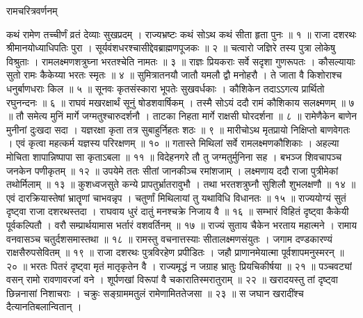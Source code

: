 
\translink{}

रामचरित्रवर्णनम्

कथं रामेण तच्चीर्णं व्रतं देव्याः सुखप्रदम् ।
राज्यभ्रष्टः कथं सोऽथ कथं सीता हृता पुनः ॥ १ ॥
राजा दशरथः श्रीमानयोध्याधिपतिः पुरा ।
सूर्यवंशधरश्चासीद्देवब्राह्मणपूजकः ॥ २ ॥
चत्वारो जज्ञिरे तस्य पुत्रा लोकेषु विश्रुताः ।
रामलक्ष्मणशत्रुघ्ना भरतश्चेति नामतः ॥ ३ ॥
राज्ञः प्रियकराः सर्वे सदृशा गुणरूपतः ।
कौसल्यायाः सुतो रामः कैकेय्या भरतः स्मृतः ॥ ४ ॥
सुमित्रातनयौ जातौ यमलौ द्वौ मनोहरौ ।
ते जाता वै किशोराश्च धनुर्बाणधराः किल ॥ ५ ॥
सूनवः कृतसंस्कारा भूपतेः सुखवर्धकाः ।
कौशिकेन तदाऽऽगत्य प्रार्थितो रघुनन्दनः ॥ ६ ॥
राघवं मखरक्षार्थं सूनुं षोडशवार्षिकम् ।
तस्मै सोऽयं ददौ रामं कौशिकाय सलक्ष्मणम् ॥ ७ ॥
तौ समेत्य मुनिं मार्गे जग्मतुश्चारुदर्शनौ ।
ताटका निहता मार्गे राक्षसी घोरदर्शना ॥ ८ ॥
रामेणैकेन बाणेन मुनीनां दुःखदा सदा ।
यज्ञरक्षा कृता तत्र सुबाहुर्निहतः शठः ॥ ९ ॥
मारीचोऽथ मृतप्रायो निक्षिप्तो बाणवेगतः ।
एवं कृत्वा महत्कर्म यज्ञस्य परिरक्षणम् ॥ १० ॥
गतास्ते मिथिलां सर्वे रामलक्ष्मणकौशिकाः ।
अहल्या मोचिता शापान्निष्पापा सा कृताऽबला ॥ ११ ॥
विदेहनगरे तौ तु जग्मतुर्मुनिना सह ।
बभञ्ज शिवचापञ्च जनकेन पणीकृतम् ॥ १२ ॥
उपयेमे ततः सीतां जानकीञ्च रमांशजाम् ।
लक्ष्मणाय ददौ राजा पुत्रीमेकां तथोर्मिलाम् ॥ १३ ॥
कुशध्वजसुते कन्ये प्रापतुर्भ्रातरावुभौ ।
तथा भरतशत्रुघ्नौ सुशिलौ शुभलक्षणौ ॥ १४ ॥
एवं दारक्रियास्तेषां भ्रातॄणां चाभवन्नृप ।
चतुर्णां मिथिलायां तु यथाविधि विधानतः ॥ १५ ॥
राज्ययोग्यं सुतं दृष्ट्वा राजा दशरथस्तदा ।
राघवाय धुरं दातुं मनश्चक्रे निजाय वै ॥ १६ ॥
सम्भारं विहितं दृष्ट्वा कैकेयी पूर्वकल्पितौ ।
वरौ सम्प्रार्थयामास भर्तारं वशवर्तिनम् ॥ १७ ॥
राज्यं सुताय चैकेन भरताय महात्मने ।
रामाय वनवासञ्च चतुर्दशसमास्तथा ॥ १८ ॥
रामस्तु वचनात्तस्याः सीतालक्ष्मणसंयुतः ।
जगाम दण्डकारण्यं राक्षसैरुपसेवितम् ॥ १९ ॥
राजा दशरथः पुत्रविरहेण प्रपीडितः ।
जहौ प्राणानमेयात्मा पूर्वशापमनुस्मरन् ॥ २० ॥
भरतः पितरं दृष्ट्वा मृतं मातृकृतेन वै ।
राज्यमृद्धं न जग्राह भ्रातुः प्रियचिकीर्षया ॥ २१ ॥
पञ्चवट्यां वसन् रामो रावणावरजां वने ।
शूर्पणखां विरूपां वै चकारातिस्मरातुराम् ॥ २२ ॥
खरादयस्तु तां दृष्ट्वा छिन्ननासां निशाचराः ।
चक्रुः सङ्ग्राममतुलं रामेणामिततेजसा ॥ २३ ॥
स जघान खरादींश्च दैत्यानतिबलान्वितान् ।

